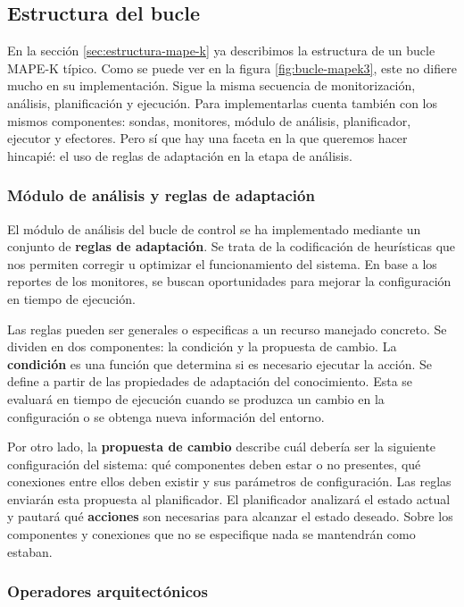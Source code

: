 \subsection{Estructura del bucle}

En la sección \ref{sec:estructura-mape-k} ya describimos la estructura de un bucle MAPE-K típico. Como se puede ver en la figura \ref{fig:bucle-mapek3}, este no difiere mucho en su implementación. Sigue la misma secuencia de monitorización, análisis, planificación y ejecución. Para implementarlas cuenta también con los mismos componentes: sondas, monitores, módulo de análisis, planificador, ejecutor y efectores. Pero sí que hay una faceta en la que queremos hacer hincapié: el uso de reglas de adaptación en la etapa de análisis.

\subsubsection{Módulo de análisis y reglas de adaptación}

El módulo de análisis del bucle de control se ha implementado mediante un conjunto de \textbf{reglas de adaptación}. Se trata de la codificación de heurísticas que nos permiten corregir u optimizar el funcionamiento del sistema. En base a los reportes de los monitores, se buscan oportunidades para mejorar la configuración en tiempo de ejecución.

Las reglas pueden ser generales o especificas a un recurso manejado concreto. Se dividen en dos componentes: la condición y la propuesta de cambio. La \textbf{condición} es una función que determina si es necesario ejecutar la acción. Se define a partir de las propiedades de adaptación del conocimiento. Esta se evaluará en tiempo de ejecución cuando se produzca un cambio en la configuración o se obtenga nueva información del entorno.

Por otro lado, la \textbf{propuesta de cambio} describe cuál debería ser la siguiente configuración del sistema: qué componentes deben estar o no presentes, qué conexiones entre ellos deben existir y sus parámetros de configuración. Las reglas enviarán esta propuesta al planificador. El planificador analizará el estado actual y pautará qué \textbf{acciones} son necesarias para alcanzar el estado deseado. Sobre los componentes y conexiones que no se especifique nada se mantendrán como estaban.

\subsubsection{Operadores arquitectónicos}

